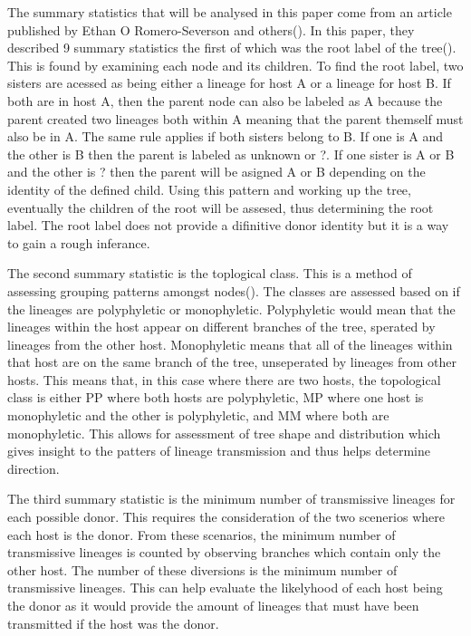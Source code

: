 \documentclass[final,5p,times,twocolumn,authoryear]{elsarticle}
\begin{document}
The summary statistics that will be analysed in this paper come from an article published by Ethan O Romero-Severson and others(\cite{10.1534/genetics.117.300284}). In this paper, they described 9 summary statistics the first of which was the root label of the tree(\cite{doi:10.1073/pnas.1522930113}). This is found by examining each node and its children. To find the root label, two sisters are acessed as being either a lineage for host A or a lineage for host B. If both are in host A, then the parent node can also be labeled as A because the parent created two lineages both within A meaning that the parent themself must also be in A. The same rule applies if both sisters belong to B. If one is A and the other is B then the parent is labeled as unknown or ?. If one sister is A or B and the other is ? then the parent will be asigned A or B depending on the identity of the defined child. Using this pattern and working up the tree, eventually the children of the root will be assesed, thus determining the root label. The root label does not provide a difinitive donor identity but it is a way to gain a rough inferance.

The second summary statistic is the toplogical class. This is a method of assessing grouping patterns amongst nodes(\cite{doi:10.1073/pnas.1522930113}). The classes are assessed based on if the lineages are polyphyletic or monophyletic. Polyphyletic would mean that the lineages within the host appear on different branches of the tree, sperated by lineages from the other host. Monophyletic means that all of the lineages within that host are on the same branch of the tree, unseperated by lineages from other hosts. This means that, in this case where there are two hosts, the topological class is either PP where both hosts are polyphyletic, MP where one host is monophyletic and the other is polyphyletic, and MM where both are monophyletic. This allows for assessment of tree shape and distribution which gives insight to the patters of lineage transmission and thus helps determine direction.

The third summary statistic is the minimum number of transmissive lineages for each possible donor. This requires the consideration of the two scenerios where each host is the donor. From these scenarios, the minimum number of transmissive lineages is counted by observing branches which contain only the other host. The number of these diversions is the minimum number of transmissive lineages. This can help evaluate the likelyhood of each host being the donor as it would provide the amount of lineages that must have been transmitted if the host was the donor.
\end{document}
